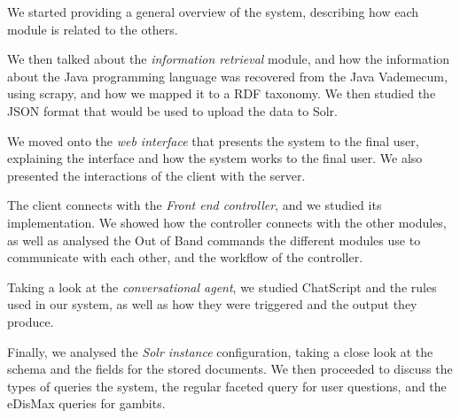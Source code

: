 We started providing a general overview of the system, describing how each module is related to the others.

We then talked about the \emph{information retrieval} module, and how the information about the Java programming language was recovered from the Java Vademecum, using scrapy, and how we mapped it to a \ac{RDF} taxonomy. We then studied the JSON format that would be used to upload the data to Solr.

We moved onto the \emph{web interface} that presents the system to the final user, explaining the interface and how the system works to the final user. We also presented the interactions of the client with the server. 

The client connects with the \emph{Front end controller}, and we studied its implementation. We showed how the controller connects with the other modules, as well as analysed the Out of Band commands the different modules use to communicate with each other, and the workflow of the controller.

Taking a look at the \emph{conversational agent}, we studied ChatScript and the rules used in our system, as well as how they were triggered and the output they produce.

Finally, we analysed the \emph{Solr instance} configuration, taking a close look at the schema and the fields for the stored documents. We then proceeded to discuss the types of queries the system, the regular faceted query for user questions, and the eDisMax queries for gambits.